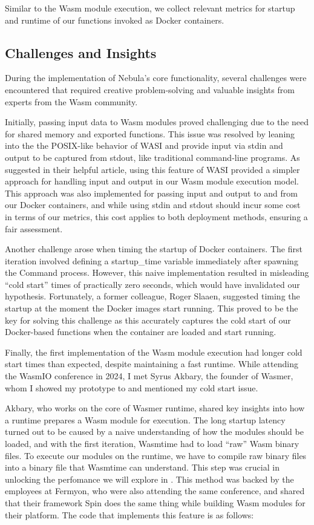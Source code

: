 \documentclass[
  table]{report}
\begin{document}
Similar to the \ac{Wasm} module execution, we collect relevant metrics
for startup and runtime of our functions invoked as Docker containers.

\subsection{Challenges and Insights} 
\label{sect:6-challenge_insights}

During the implementation of Nebula's core functionality, several
challenges were encountered that required creative problem-solving and
valuable insights from experts from the \ac{Wasm} community.

Initially, passing input data to Wasm modules proved challenging due to
the need for shared memory and exported functions. This issue was
resolved by leaning into the the POSIX-like behavior of WASI and provide
input via stdin and output to be captured from stdout, like traditional
command-line programs. As \citet{malmgrenGettingDataOut2022a} suggested
in their helpful article, using this feature of WASI provided a simpler
approach for handling input and output in our Wasm module execution
model. This approach was also implemented for passing input and output
to and from our Docker containers, and while using stdin and stdout
should incur some cost in terms of our metrics, this cost applies to
both deployment methods, ensuring a fair assessment.

Another challenge arose when timing the startup of Docker containers.
The first iteration involved defining a startup\_time variable
immediately after spawning the Command process. However, this naive
implementation resulted in misleading ``cold start'' times of
practically zero seconds, which would have invalidated our hypothesis.
Fortunately, a former colleague, Roger Slaaen, suggested timing the
startup at the moment the Docker images start running. This proved to be
the key for solving this challenge as this accurately captures the cold
start of our Docker-based functions when the container are loaded and
start running.

Finally, the first implementation of the \ac{Wasm} module execution had
longer cold start times than expected, despite maintaining a fast
runtime. While attending the WasmIO conference in 2024, I met Syrus
Akbary, the founder of Wasmer, whom I showed my prototype to and
mentioned my cold start issue.

Akbary, who works on the core of Wasmer runtime, shared key insights
into how a runtime prepares a \ac{Wasm} module for execution. The long
startup latency turned out to be caused by a naive understanding of how
the modules should be loaded, and with the first iteration, Wasmtime had
to load ``raw'' Wasm binary files. To execute our modules on the
runtime, we have to compile raw binary files into a binary file that
Wasmtime can understand. This step was crucial in unlocking the
perfomance we will explore in . This method was
backed by the employees at Fermyon, who were also attending the same
conference, and shared that their framework Spin does the same thing
while building \ac{Wasm} modules for their platform. The code that
implements this feature is as follows:
\end{document}
